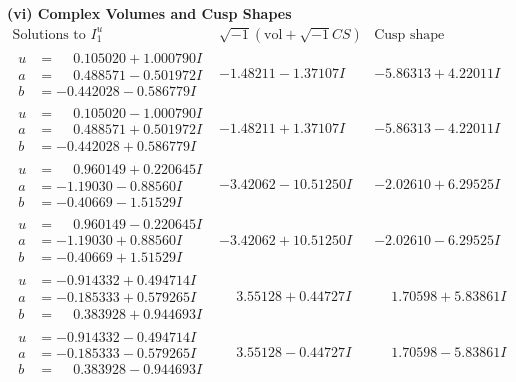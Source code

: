 \documentclass[1p]{elsarticle_modified}
\theoremstyle{definition}
\newcommand{\I}{\sqrt{-1}}
\begin{document}
\newpage\flushleft \textbf{(vi) Complex Volumes and Cusp Shapes}
$$\begin{array}{c|c|c}  
\text{Solutions to }I^u_{1}& \I (\text{vol} + \sqrt{-1}CS) & \text{Cusp shape}\\
 \hline 
\begin{aligned}
u &= \phantom{-}0.105020 + 1.000790 I \\
a &= \phantom{-}0.488571 - 0.501972 I \\
b &= -0.442028 - 0.586779 I\end{aligned}
 & -1.48211 - 1.37107 I & -5.86313 + 4.22011 I \\ \hline\begin{aligned}
u &= \phantom{-}0.105020 - 1.000790 I \\
a &= \phantom{-}0.488571 + 0.501972 I \\
b &= -0.442028 + 0.586779 I\end{aligned}
 & -1.48211 + 1.37107 I & -5.86313 - 4.22011 I \\ \hline\begin{aligned}
u &= \phantom{-}0.960149 + 0.220645 I \\
a &= -1.19030 - 0.88560 I \\
b &= -0.40669 - 1.51529 I\end{aligned}
 & -3.42062 - 10.51250 I & -2.02610 + 6.29525 I \\ \hline\begin{aligned}
u &= \phantom{-}0.960149 - 0.220645 I \\
a &= -1.19030 + 0.88560 I \\
b &= -0.40669 + 1.51529 I\end{aligned}
 & -3.42062 + 10.51250 I & -2.02610 - 6.29525 I \\ \hline\begin{aligned}
u &= -0.914332 + 0.494714 I \\
a &= -0.185333 + 0.579265 I \\
b &= \phantom{-}0.383928 + 0.944693 I\end{aligned}
 & \phantom{-}3.55128 + 0.44727 I & \phantom{-}1.70598 + 5.83861 I \\ \hline\begin{aligned}
u &= -0.914332 - 0.494714 I \\
a &= -0.185333 - 0.579265 I \\
b &= \phantom{-}0.383928 - 0.944693 I\end{aligned}
 & \phantom{-}3.55128 - 0.44727 I & \phantom{-}1.70598 - 5.83861 I \\ \hline\begin{aligned}

\end{aligned}
\end{array}$$
\end{document}
